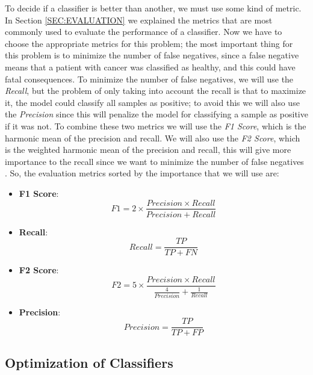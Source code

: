 To decide if a classifier is better than another, we must use some kind of metric. In Section \ref{SEC:EVALUATION} we explained the metrics that are most commonly used to evaluate the performance of a classifier. Now we have to choose the appropriate metrics for this problem; the most important thing for this problem is to minimize the number of false negatives, since a false negative means that a patient with cancer was classified as healthy, and this could have fatal consequences. To minimize the number of false negatives, we will use the \textit{Recall}, but the problem of only taking into account the recall is that to maximize it, the model could classify all samples as positive; to avoid this we will also use the \textit{Precision} since this will penalize the model for classifying a sample as positive if it was not. To combine these two metrics we will use the \textit{F1 Score}, which is the harmonic mean of the precision and recall. We will also use the \textit{F2 Score}, which is the weighted harmonic mean of the precision and recall, this will give more importance to the recall since we want to minimize the number of false negatives \cite{rutecki_best_nodate}. So, the evaluation metrics sorted by the importance that we will use are:

\begin{itemize}
    \item \textbf{F1 Score}: $$F1 = 2 \times \frac{Precision \times Recall}{Precision + Recall}$$
    \item \textbf{Recall}: $$Recall = \frac{TP}{TP + FN}$$
    \item \textbf{F2 Score}: $$F2 = 5 \times \frac{Precision \times Recall}{\frac{4}{Precision} + \frac{1}{Recall}}$$
    \item \textbf{Precision}: $$Precision = \frac{TP}{TP + FP}$$
\end{itemize}


\subsection{Optimization of Classifiers}

